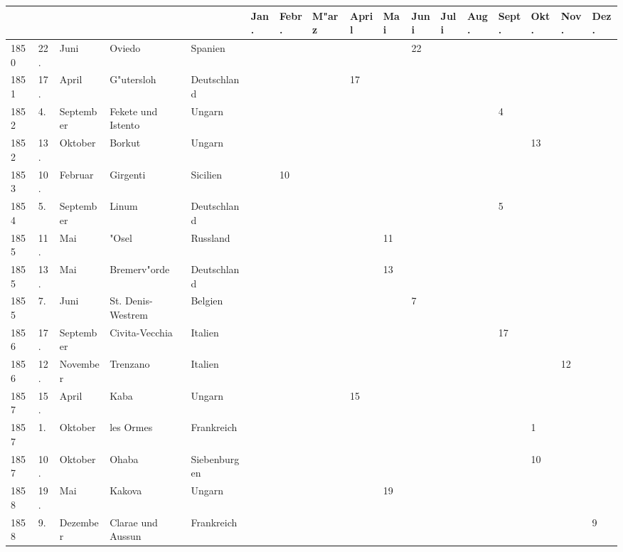 \documentclass[a4paper, 8pt, oneside, polutonikogreek, german]{article}
\begin{document}
\begin{landscape}
\vspace*{\fill}
\begin{table}[H]
    \footnotesize
    \centering
    \begin{longtable}{|p{5mm}|p{4mm}|p{13mm}|p{23mm}|p{17mm}|p{4mm}|p{6mm}|p{6mm}|p{6mm}|p{4mm}|p{5mm}|p{4mm}|p{5mm}|p{6mm}|p{5mm}|p{5mm}|p{5mm}|}
    \hline
         &  &  &  &  & Jan. & Febr. & M"arz & April & Mai & Juni & Juli & Aug. & Sept. & Okt. & Nov. & Dez. \\ \hline
        1850 & 22. & Juni & Oviedo & Spanien & ~ & ~ & ~ & ~ & ~ & 22 & ~ & ~ & ~ & ~ & ~ & ~ \\ \hline
        1851 & 17. & April & G"utersloh & Deutschland & ~ & ~ & ~ & 17 & ~ & ~ & ~ & ~ & ~ & ~ & ~ & ~ \\ \hline
        1852 & 4. & September & Fekete und Istento & Ungarn & ~ & ~ & ~ & ~ & ~ & ~ & ~ & ~ & 4 & ~ & ~ & ~ \\ \hline
        1852 & 13. & Oktober & Borkut & Ungarn & ~ & ~ & ~ & ~ & ~ & ~ & ~ & ~ & ~ & 13 & ~ & ~ \\ \hline
        1853 & 10. & Februar & Girgenti & Sicilien & ~ & 10 & ~ & ~ & ~ & ~ & ~ & ~ & ~ & ~ & ~ & ~ \\ \hline
        1854 & 5. & September & Linum & Deutschland & ~ & ~ & ~ & ~ & ~ & ~ & ~ & ~ & 5 & ~ & ~ & ~ \\ \hline
        1855 & 11. & Mai & "Osel & Russland & ~ & ~ & ~ & ~ & 11 & ~ & ~ & ~ & ~ & ~ & ~ & ~ \\ \hline
        1855 & 13. & Mai & Bremerv"orde & Deutschland & ~ & ~ & ~ & ~ & 13 & ~ & ~ & ~ & ~ & ~ & ~ & ~ \\ \hline
        1855 & 7. & Juni & St. Denis-Westrem & Belgien & ~ & ~ & ~ & ~ & ~ & 7 & ~ & ~ & ~ & ~ & ~ & ~ \\ \hline
        1856 & 17. & September & Civita-Vecchia & Italien & ~ & ~ & ~ & ~ & ~ & ~ & ~ & ~ & 17 & ~ & ~ & ~ \\ \hline
        1856 & 12. & November & Trenzano & Italien & ~ & ~ & ~ & ~ & ~ & ~ & ~ & ~ & ~ & ~ & 12 & ~ \\ \hline
        1857 & 15. & April & Kaba & Ungarn & ~ & ~ & ~ & 15 & ~ & ~ & ~ & ~ & ~ & ~ & ~ & ~ \\ \hline
        1857 & 1. & Oktober & les Ormes & Frankreich & ~ & ~ & ~ & ~ & ~ & ~ & ~ & ~ & ~ & 1 & ~ & ~ \\ \hline
        1857 & 10. & Oktober & Ohaba & Siebenburgen & ~ & ~ & ~ & ~ & ~ & ~ & ~ & ~ & ~ & 10 & ~ & ~ \\ \hline
        1858 & 19. & Mai & Kakova & Ungarn & ~ & ~ & ~ & ~ & 19 & ~ & ~ & ~ & ~ & ~ & ~ & ~ \\ \hline
        1858 & 9. & Dezember & Clarae und Aussun & Frankreich & ~ & ~ & ~ & ~ & ~ & ~ & ~ & ~ & ~ & ~ & ~ & 9 \\ \hline
    \end{longtable}
\end{table}
\vspace*{\fill}
\end{landscape}
\clearpage
\vspace*{\fill}
\end{document}
